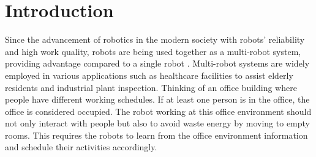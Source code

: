 





\chapter{Introduction}
Since the advancement of robotics in the modern society with robots' reliability and high work quality, robots are being used together as a multi-robot system, providing advantage compared to a single robot \cite{Eijyne2020DevelopmentOA}. 
Multi-robot systems are widely employed in various applications such as healthcare facilities to assist elderly residents \cite{retire2017} and industrial plant inspection\cite{Chun12}.
Thinking of an office building where people have different working schedules. If at least one person is in the office, the office is considered occupied. The robot working at this office environment should not only interact with people but also to avoid waste energy by moving to empty rooms. This requires the robots to learn from the office environment information and schedule their activities accordingly. 

